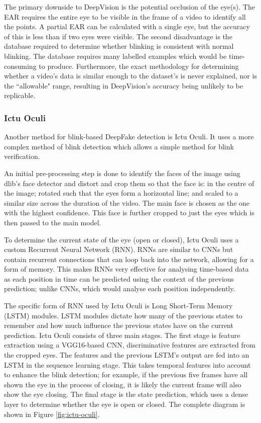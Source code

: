 The primary downside to DeepVision is the potential occlusion of the eye(s). The EAR requires the entire eye to be visible in the frame of a video to identify all the points. A partial EAR can be calculated with a single eye, but the accuracy of this is less than if two eyes were visible. The second disadvantage is the database required to determine whether blinking is consistent with normal blinking. The database requires many labelled examples which would be time-consuming to produce. Furthermore, the exact methodology for determining whether a video's data is similar enough to the dataset's is never explained, nor is the ``allowable" range, resulting in DeepVision's accuracy being unlikely to be replicable.

\subsubsection{Ictu Oculi}

Another method for blink-based DeepFake detection is Ictu Oculi\cite{li2018ictu}. It uses a more complex method of blink detection which allows a simple method for blink verification. 

An initial pre-processing step is done to identify the faces of the image using dlib's\cite{king2009dlib} face detector and distort and crop them so that the face is: in the centre of the image; rotated such that the eyes form a horizontal line; and scaled to a similar size across the duration of the video. The main face is chosen as the one with the highest confidence. This face is further cropped to just the eyes which is then passed to the main model.

To determine the current state of the eye (open or closed), Ictu Oculi uses a custom Recurrent Neural Network (RNN). RNNs are similar to CNNs but contain recurrent connections that can loop back into the network, allowing for a form of memory. This makes RNNs very effective for analysing time-based data as each position in time can be predicted using the context of the previous prediction; unlike CNNs, which would analyse each position independently.

The specific form of RNN used by Ictu Oculi is Long Short-Term Memory (LSTM) modules\cite{hochreiter1997long}. LSTM modules dictate how many of the previous states to remember and how much influence the previous states have on the current prediction. Ictu Oculi consists of three main stages. The first stage is feature extraction using a VGG16-based CNN, discriminative features are extracted from the cropped eyes. The features and the previous LSTM's output are fed into an LSTM in the sequence learning stage. This takes temporal features into account to enhance the blink detection; for example, if the previous five frames have all shown the eye in the process of closing, it is likely the current frame will also show the eye closing. The final stage is the state prediction, which uses a dense layer to determine whether the eye is open or closed. The complete diagram is shown in Figure \ref{fig:ictu-oculi}.

